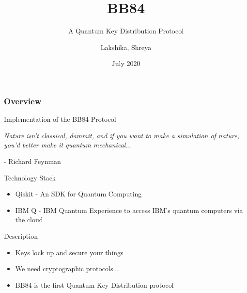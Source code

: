 \documentclass[10 pt]{beamer}
\title[BB84]{BB84}
\subtitle{A Quantum Key Distribution Protocol}
\author[Team 37]{Lakshika, Shreya}
\date{July 2020}
\begin{document}
\begin{frame}
	\titlepage
\end{frame}

\begin{frame}
	\frametitle{Overview}
	 Implementation of the BB84 Protocol
\end{frame}


\begin{frame}[standout]
    \begin{center}
        \emph{Nature isn’t classical, dammit, and if you want to make a simulation of nature, you’d better make it quantum mechanical...}
    \end{center}
    \begin{flushright}
        - Richard Feynman
    \end{flushright}
\end{frame}


\begin{frame}{Technology Stack}
	\begin{itemize}
		\item Qiskit - An SDK for Quantum Computing
		\item IBM Q - IBM Quantum Experience to access IBM's quantum computers via the cloud
	\end{itemize}
\end{frame}

\begin{frame}{Description}
    \begin{itemize}[<+->] 
        \item Keys lock up and secure your things
        \item We need cryptographic protocols...
        \item BB84 is the first Quantum Key Distribution protocol
    \end{itemize}
\end{frame}
\end{document}
